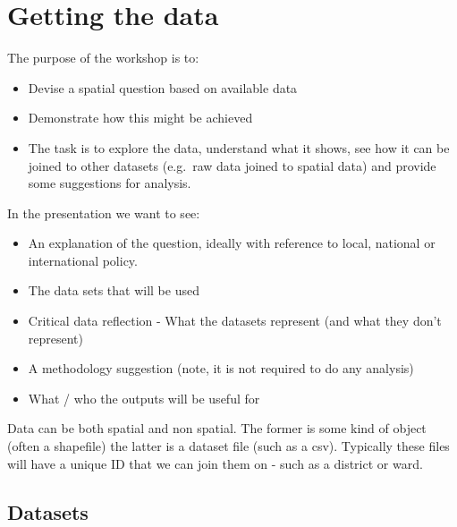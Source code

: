 \documentclass[
  letterpaper,
]{scrbook}
\providecommand{\tightlist}{%
  \setlength{\itemsep}{0pt}\setlength{\parskip}{0pt}}\usepackage{longtable,booktabs,array}
\begin{document}

\hypertarget{getting-the-data}{%
\chapter{Getting the data}\label{getting-the-data}}

The purpose of the workshop is to:

\begin{itemize}
\tightlist
\item
  Devise a spatial question based on available data
\item
  Demonstrate how this might be achieved
\item
  The task is to explore the data, understand what it shows, see how it
  can be joined to other datasets (e.g.~raw data joined to spatial data)
  and provide some suggestions for analysis.
\end{itemize}

In the presentation we want to see:

\begin{itemize}
\tightlist
\item
  An explanation of the question, ideally with reference to local,
  national or international policy.
\item
  The data sets that will be used
\item
  Critical data reflection - What the datasets represent (and what they
  don't represent)
\item
  A methodology suggestion (note, it is not required to do any analysis)
\item
  What / who the outputs will be useful for
\end{itemize}

Data can be both spatial and non spatial. The former is some kind of
object (often a shapefile) the latter is a dataset file (such as a csv).
Typically these files will have a unique ID that we can join them on -
such as a district or ward.

\hypertarget{datasets}{%
\section{Datasets}\label{datasets}}
\end{document}
